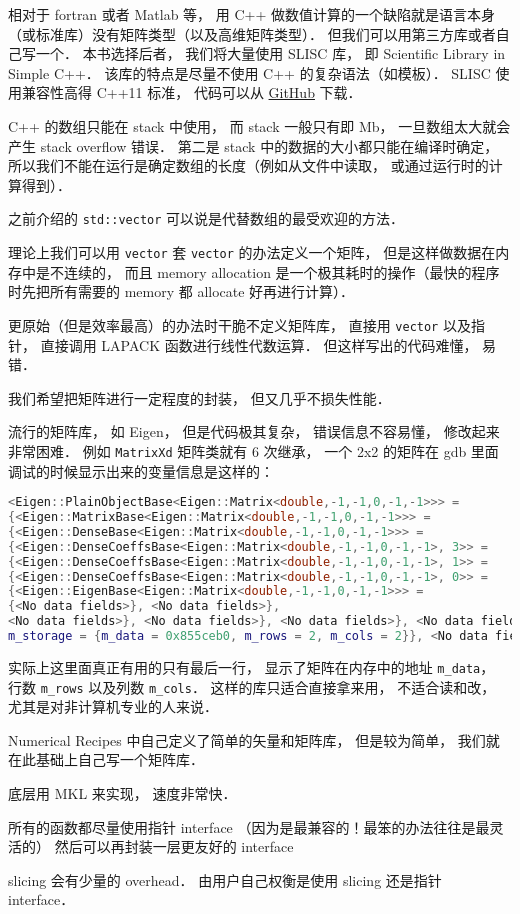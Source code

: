
\begin{issues}
\issueDraft
\end{issues}

相对于 fortran 或者 Matlab 等， 用 C++ 做数值计算的一个缺陷就是语言本身（或标准库）没有矩阵类型（以及高维矩阵类型）． 但我们可以用第三方库或者自己写一个． 本书选择后者， 我们将大量使用 SLISC 库， 即 Scientific Library in Simple C++． 该库的特点是尽量不使用 C++ 的复杂语法（如模板）． SLISC 使用兼容性高得 C++11 标准， 代码可以从 \href{https://github.com/MacroUniverse/SLISC0}{GitHub} 下载．

C++ 的数组只能在 stack 中使用， 而 stack 一般只有即 Mb， 一旦数组太大就会产生 stack overflow 错误． 第二是 stack 中的数据的大小都只能在编译时确定， 所以我们不能在运行是确定数组的长度（例如从文件中读取， 或通过运行时的计算得到）．

之前介绍的 \verb|std::vector| 可以说是代替数组的最受欢迎的方法．

理论上我们可以用 \verb|vector| 套 \verb|vector| 的办法定义一个矩阵， 但是这样做数据在内存中是不连续的， 而且 memory allocation 是一个极其耗时的操作（最快的程序时先把所有需要的 memory 都 allocate 好再进行计算）．

更原始（但是效率最高）的办法时干脆不定义矩阵库， 直接用 \verb|vector| 以及指针， 直接调用 LAPACK 函数进行线性代数运算． 但这样写出的代码难懂， 易错．

我们希望把矩阵进行一定程度的封装， 但又几乎不损失性能．

流行的矩阵库， 如 Eigen， 但是代码极其复杂， 错误信息不容易懂， 修改起来非常困难． 例如 \verb|MatrixXd| 矩阵类就有 6 次继承， 一个 2x2 的矩阵在 gdb 里面调试的时候显示出来的变量信息是这样的：
\begin{lstlisting}[language=cpp]
<Eigen::PlainObjectBase<Eigen::Matrix<double,-1,-1,0,-1,-1>>> = 
{<Eigen::MatrixBase<Eigen::Matrix<double,-1,-1,0,-1,-1>>> = 
{<Eigen::DenseBase<Eigen::Matrix<double,-1,-1,0,-1,-1>>> = 
{<Eigen::DenseCoeffsBase<Eigen::Matrix<double,-1,-1,0,-1,-1>, 3>> = 
{<Eigen::DenseCoeffsBase<Eigen::Matrix<double,-1,-1,0,-1,-1>, 1>> = 
{<Eigen::DenseCoeffsBase<Eigen::Matrix<double,-1,-1,0,-1,-1>, 0>> = 
{<Eigen::EigenBase<Eigen::Matrix<double,-1,-1,0,-1,-1>>> =
{<No data fields>}, <No data fields>}, 
<No data fields>}, <No data fields>}, <No data fields>}, <No data fields>},
m_storage = {m_data = 0x855ceb0, m_rows = 2, m_cols = 2}}, <No data fields>
\end{lstlisting}
实际上这里面真正有用的只有最后一行， 显示了矩阵在内存中的地址 \verb|m_data|， 行数 \verb|m_rows| 以及列数 \verb|m_cols|． 这样的库只适合直接拿来用， 不适合读和改， 尤其是对非计算机专业的人来说．

Numerical Recipes 中自己定义了简单的矢量和矩阵库， 但是较为简单， 我们就在此基础上自己写一个矩阵库．

底层用 MKL 来实现， 速度非常快．

所有的函数都尽量使用指针 interface （因为是最兼容的！最笨的办法往往是最灵活的） 然后可以再封装一层更友好的 interface

slicing 会有少量的 overhead． 由用户自己权衡是使用 slicing 还是指针 interface．
